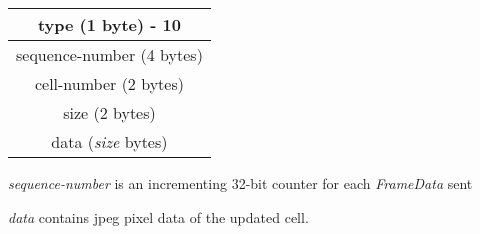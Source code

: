 \documentclass{article}
\begin{document}
    \begin{center}
        \begin{tabular}{|c|}
            \hline
            type (1 byte) - 10        \\
            \hline
            sequence-number (4 bytes) \\
            \hline
            cell-number (2 bytes)     \\
            \hline
            size (2 bytes)            \\
            \hline
            data (\emph{size} bytes)  \\
            \hline
        \end{tabular}
    \end{center}

    \emph{sequence-number} is an incrementing 32-bit counter for each \emph{FrameData} sent

    \emph{data} contains jpeg pixel data of the updated cell.
\end{document}
